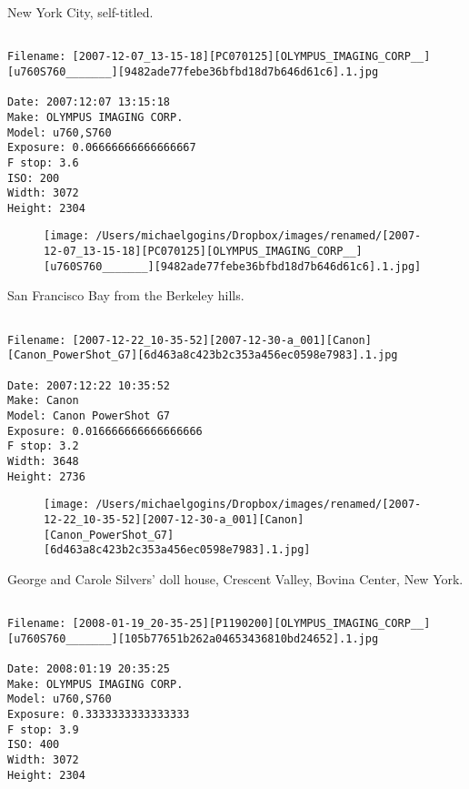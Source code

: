 \documentclass[11pt,letter,DIV=14,paper=landscape]{scrbook}
\begin{document}
\clearpage
\noindent New York City, self-titled.
\noindent
\begin{lstlisting}

Filename: [2007-12-07_13-15-18][PC070125][OLYMPUS_IMAGING_CORP__][u760S760_______][9482ade77febe36bfbd18d7b646d61c6].1.jpg

Date: 2007:12:07 13:15:18
Make: OLYMPUS IMAGING CORP.  
Model: u760,S760       
Exposure: 0.06666666666666667
F stop: 3.6
ISO: 200
Width: 3072
Height: 2304
\end{lstlisting}
\clearpage

\begin{figure}
\texttt{[image: /Users/michaelgogins/Dropbox/images/renamed/[2007-12-07\_13-15-18][PC070125][OLYMPUS\_IMAGING\_CORP\_\_][u760S760\_\_\_\_\_\_\_][9482ade77febe36bfbd18d7b646d61c6].1.jpg]}
\end{figure}
    
\clearpage
\noindent San Francisco Bay from the Berkeley hills.
\noindent
\begin{lstlisting}

Filename: [2007-12-22_10-35-52][2007-12-30-a_001][Canon][Canon_PowerShot_G7][6d463a8c423b2c353a456ec0598e7983].1.jpg

Date: 2007:12:22 10:35:52
Make: Canon
Model: Canon PowerShot G7
Exposure: 0.016666666666666666
F stop: 3.2
Width: 3648
Height: 2736
\end{lstlisting}
\clearpage

\begin{figure}
\texttt{[image: /Users/michaelgogins/Dropbox/images/renamed/[2007-12-22\_10-35-52][2007-12-30-a\_001][Canon][Canon\_PowerShot\_G7][6d463a8c423b2c353a456ec0598e7983].1.jpg]}
\end{figure}
    
\clearpage
\noindent George and Carole Silvers' doll house, Crescent Valley, Bovina Center, New York.
\noindent
\begin{lstlisting}

Filename: [2008-01-19_20-35-25][P1190200][OLYMPUS_IMAGING_CORP__][u760S760_______][105b77651b262a04653436810bd24652].1.jpg

Date: 2008:01:19 20:35:25
Make: OLYMPUS IMAGING CORP.  
Model: u760,S760       
Exposure: 0.3333333333333333
F stop: 3.9
ISO: 400
Width: 3072
Height: 2304
\end{lstlisting}
\clearpage
\end{document}
